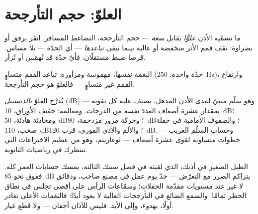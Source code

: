 \section{العلوّ: حجم التأرجحة}

\begin{proposition}\label{prop:g8:sound-pitch-loudness:loudness}
ما تسمّيه الأذن \emph{علوًّا} يقابل \emph{سعة}
 --- حجم التأرجحة،  التضاغط المسافر. انقر برفق أو
بضراوة: تقف قمم الأثر منخفضة أو عالية بينما يبقى
\emph{تباعدها} --- أي الحدّة --- بلا مساس.  
قرصا ضبط مستقلّان: فأيّ حدّة قد تُهمَس أو تُزأر.
\end{proposition}

\begin{omfigure}

{\small النغمة نفسها، مهموسة ومزأورة: تباعد القمم متساوٍ
(حدّة واحدة، \qty{250}{Hz})، وارتفاع القمم غير متساوٍ ---
فالعلوّ هو حجم التأرجحة.}
\end{omfigure}

\begin{example}[سلّم الديسيبل]\label{ex:g8:sound-pitch-loudness:decibels}
يُدرَّج العلوّ \emph{بالديسيبل} (\unit{dB}) ---
وهو سلّم مبنيّ لمدى الأذن المذهل، يضيف عليه كل تقوية 
بمقدار عشرة أضعاف العددَ نفسه من الدرجات. ومعالمه: حفيف
الأوراق، \qty{10}{dB}؛ ومحادثة هادئة، \qty{50}{dB}؛ وحركة
مرور مزدحمة، \qty{80}{dB}؛ والصفوف الأمامية في حفلة صخب،
\qty{110}{dB}؛ والألم والأذى الفوري، قرب \qty{120}{dB}. وحساب
السلّم الغريب --- خطوات متساوية لقوى عشرة أضعاف --- لوغاريتم،
وهو من عظيم الاختراعات التي تنتظرك في رياضيات الثانوية.
\end{example}

\begin{remark}\label{rem:g8:sound-pitch-loudness:earsafety}
الطبل الصغير في أذنك، الذي لقيته في فصل سنتك الثالثة، يمسك
حسابات العمر كله. ففوق نحو \qty{85}{dB} يتراكم الضرر مع 
التعرّض --- حدّ يوم عمل في مصنع صاخب، ودقائق لا غير عند
مستويات مقدّمة الحفلات؛ وسمّاعات الرأس على أقصى  تجلس في
نطاق الخطر تمامًا. والسمع الضائع في التأرجحات العالية لا يعود
أبدًا: فالنغمات الأعلى تغادر أولًا، بهدوء، وإلى الأبد. فليس
للآذان أجفان --- ولا قطع غيار.
\end{remark}

